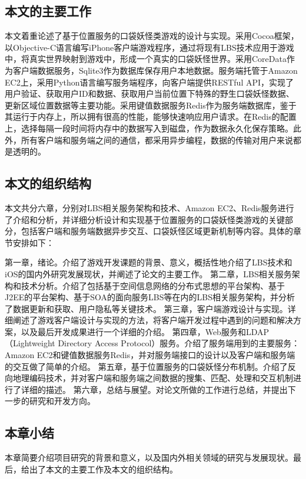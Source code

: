 \documentclass{article}
\begin{document}
\begin{CJK}{UTF8}{gbsn}
	\subsection{本文的主要工作}
  本文着重论述了基于位置服务的口袋妖怪类游戏的设计与实现。采用Cocoa框架，以Objective-C语言编写iPhone客户端游戏程序，通过将现有LBS技术应用于游戏中，将真实世界映射到游戏中，形成一个真实的口袋妖怪世界。采用CoreData作为客户端数据服务，Sqlite3作为数据库保存用户本地数据。服务端托管于Amazon EC2上，采用Python语言编写服务端程序，向客户端提供RESTful API，实现了用户验证、获取用户ID和数据、获取用户当前位置下特殊的野生口袋妖怪数据、更新区域位置数据等主要功能。采用键值数据服务Redis作为服务端数据库，鉴于其运行于内存上，所以拥有很高的性能，能够快速响应用户请求。在Redis的配置上，选择每隔一段时间将内存中的数据写入到磁盘，作为数据永久化保存策略。此外，所有客户端和服务端之间的通信，都采用异步编程，数据的传输对用户来说都是透明的。

	\subsection{本文的组织结构}
  本文共分六章，分别对LBS相关服务架构和技术、Amazon EC2、Redis服务进行了介绍和分析，并详细分析设计和实现基于位置服务的口袋妖怪类游戏的关键部分，包括客户端和服务端数据异步交互、口袋妖怪区域更新机制等内容。具体的章节安排如下：

  第一章，绪论。介绍了游戏开发课题的背景、意义，概括性地介绍了LBS技术和iOS的国内外研究发展现状，并阐述了论文的主要工作。
  第二章，LBS相关服务架构和技术分析。介绍了包括基于空间信息网络的分布式思想的平台架构、基于J2EE的平台架构、基于SOA的面向服务LBS等在内的LBS相关服务架构，并分析了数据更新和获取、用户隐私等关键技术。
  第三章，客户端游戏设计与实现。详细阐述了游戏客户端设计与实现的方法，将客户端开发过程中遇到的问题和解决方案，以及最后开发成果进行一个详细的介绍。
  第四章，Web服务和LDAP（Lightweight Directory Access Protocol）服务。介绍了服务端用到的主要服务：Amazon EC2和键值数据服务Redis，并对服务端接口的设计以及客户端和服务端的交互做了简单的介绍。
  第五章，基于位置服务的口袋妖怪分布机制。介绍了反向地理编码技术，并对客户端和服务端之间数据的搜集、匹配、处理和交互机制进行了详细的描述。
  第六章，总结与展望。对论文所做的工作进行总结，并提出下一步的研究和开发方向。

	\subsection{本章小结}
  本章简要介绍项目研究的背景和意义，以及国内外相关领域的研究与发展现状。最后，给出了本文的主要工作及本文的组织结构。



\end{CJK}
\end{document}
